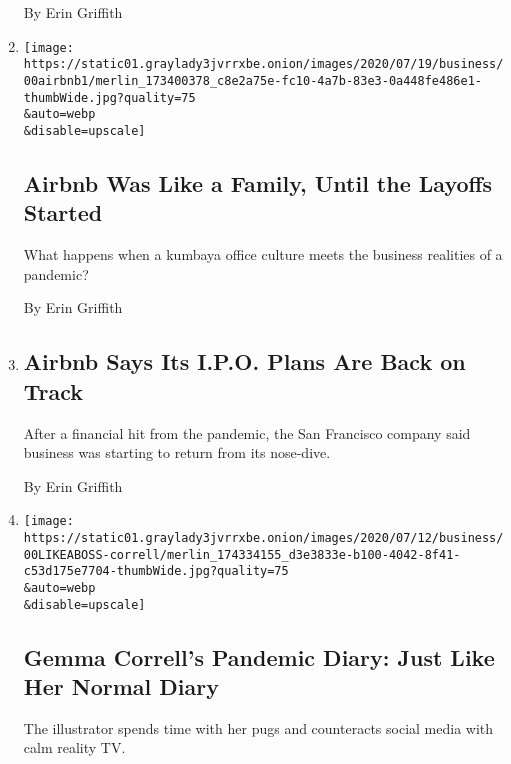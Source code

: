 \begin{enumerate}
  By Erin Griffith
\item
  \href{/2020/07/17/technology/airbnb-coronavirus-layoffs-.html}{}

  \texttt{[image: https://static01.graylady3jvrrxbe.onion/images/2020/07/19/business/00airbnb1/merlin\_173400378\_c8e2a75e-fc10-4a7b-83e3-0a448fe486e1-thumbWide.jpg?quality=75\\\&auto=webp\\\&disable=upscale]}

  \hypertarget{airbnb-was-like-a-family-until-the-layoffs-started}{%
  \subsection{Airbnb Was Like a Family, Until the Layoffs
  Started}\label{airbnb-was-like-a-family-until-the-layoffs-started}}

  What happens when a kumbaya office culture meets the business
  realities of a pandemic?

  By Erin Griffith
\item
  \href{/2020/07/15/technology/airbnb-ipo.html}{}

  \hypertarget{airbnb-says-its-ipo-plans-are-back-on-track}{%
  \subsection{Airbnb Says Its I.P.O. Plans Are Back on
  Track}\label{airbnb-says-its-ipo-plans-are-back-on-track}}

  After a financial hit from the pandemic, the San Francisco company
  said business was starting to return from its nose-dive.

  By Erin Griffith
\item
  \href{/2020/07/10/business/work-week-gemma-correll.html}{}

  \texttt{[image: https://static01.graylady3jvrrxbe.onion/images/2020/07/12/business/00LIKEABOSS-correll/merlin\_174334155\_d3e3833e-b100-4042-8f41-c53d175e7704-thumbWide.jpg?quality=75\\\&auto=webp\\\&disable=upscale]}

  \hypertarget{gemma-corrells-pandemic-diary-just-like-her-normal-diary}{%
  \subsection{Gemma Correll's Pandemic Diary: Just Like Her Normal
  Diary}\label{gemma-corrells-pandemic-diary-just-like-her-normal-diary}}

  The illustrator spends time with her pugs and counteracts social media
  with calm reality TV.


\end{enumerate}
